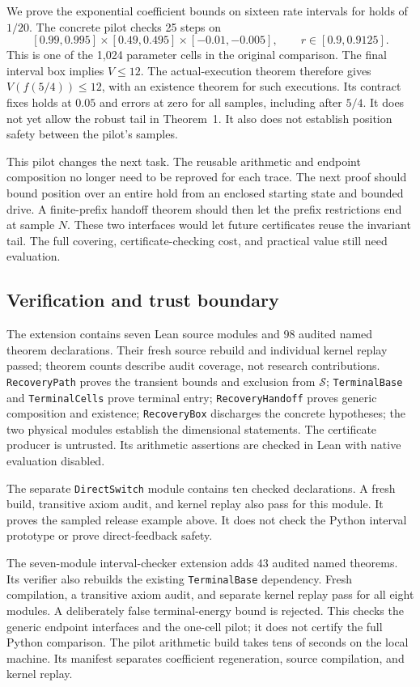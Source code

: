 \documentclass[10pt]{article}
\newcommand{\code}[1]{\texttt{#1}}
\begin{document}
We prove the exponential coefficient bounds on sixteen rate intervals for holds of $1/20$. The concrete pilot checks 25 steps on
\[
 [0.99,0.995]\times[0.49,0.495]\times[-0.01,-0.005],
 \qquad r\in[0.9,0.9125].
\]
This is one of the 1,024 parameter cells in the original comparison. The final interval box implies $V\le12$. The actual-execution theorem therefore gives $V(f(5/4))\le12$, with an existence theorem for such executions. Its contract fixes holds at $0.05$ and errors at zero for all samples, including after $5/4$. It does not yet allow the robust tail in Theorem~1. It also does not establish position safety between the pilot's samples.

This pilot changes the next task. The reusable arithmetic and endpoint composition no longer need to be reproved for each trace. The next proof should bound position over an entire hold from an enclosed starting state and bounded drive. A finite-prefix handoff theorem should then let the prefix restrictions end at sample $N$. These two interfaces would let future certificates reuse the invariant tail. The full covering, certificate-checking cost, and practical value still need evaluation.

\subsection{Verification and trust boundary}
The extension contains seven Lean source modules and 98 audited named theorem declarations. Their fresh source rebuild and individual kernel replay passed; theorem counts describe audit coverage, not research contributions. \code{RecoveryPath} proves the transient bounds and exclusion from $\mathcal S$; \code{TerminalBase} and \code{TerminalCells} prove terminal entry; \code{RecoveryHandoff} proves generic composition and existence; \code{RecoveryBox} discharges the concrete hypotheses; the two physical modules establish the dimensional statements. The certificate producer is untrusted. Its arithmetic assertions are checked in Lean with native evaluation disabled.

The separate \code{DirectSwitch} module contains ten checked declarations. A fresh build, transitive axiom audit, and kernel replay also pass for this module. It proves the sampled release example above. It does not check the Python interval prototype or prove direct-feedback safety.

The seven-module interval-checker extension adds 43 audited named theorems. Its verifier also rebuilds the existing \code{TerminalBase} dependency. Fresh compilation, a transitive axiom audit, and separate kernel replay pass for all eight modules. A deliberately false terminal-energy bound is rejected. This checks the generic endpoint interfaces and the one-cell pilot; it does not certify the full Python comparison. The pilot arithmetic build takes tens of seconds on the local machine. Its manifest separates coefficient regeneration, source compilation, and kernel replay.
\end{document}
